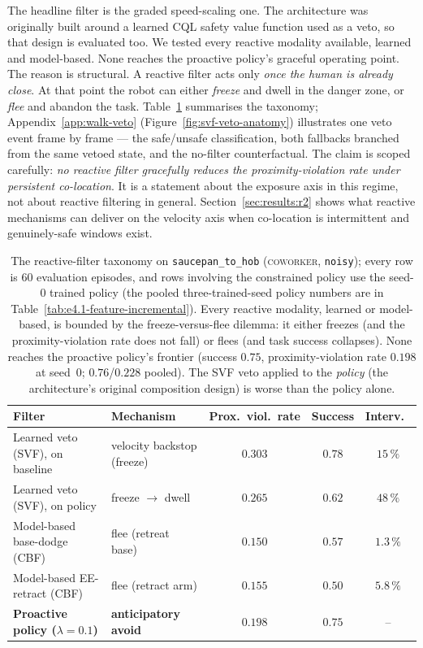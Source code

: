 \documentclass[11pt,a4paper]{report}
\newcommand{\coworker}{\textsc{coworker}}
\begin{document}
The headline filter is the graded speed-scaling one. The architecture
was originally built around a learned \textsc{CQL} safety value
function used as a veto, so that design is evaluated too. We tested
every reactive modality available, learned and model-based. None
reaches the proactive policy's graceful operating point. The reason is
structural. A reactive filter acts only \emph{once the human is already
close}. At that point the robot can either \emph{freeze} and dwell in
the danger zone, or \emph{flee} and abandon the task.
Table~\ref{tab:filter-taxonomy} summarises the taxonomy;
Appendix~\ref{app:walk-veto} (Figure~\ref{fig:svf-veto-anatomy})
illustrates one veto event frame by frame — the safe/unsafe
classification, both fallbacks branched from the same vetoed state, and
the no-filter counterfactual. The claim is
scoped carefully: \emph{no reactive filter gracefully reduces the
proximity-violation rate under persistent co-location}. It is a
statement about the exposure axis in this regime, not about reactive
filtering in general.
Section~\ref{sec:results:r2} shows what reactive mechanisms can
deliver on the velocity axis when co-location is intermittent and
genuinely-safe windows exist.

\begin{table}[htbp]
\centering
\caption{The reactive-filter taxonomy on \texttt{saucepan\_to\_hob}
(\coworker{}, \texttt{noisy}); every row is 60 evaluation episodes,
and rows involving the constrained policy use the seed-0 trained
policy (the pooled three-trained-seed policy numbers are in
Table~\ref{tab:e4.1-feature-incremental}). Every reactive modality,
learned or model-based, is bounded by the freeze-versus-flee dilemma:
it either freezes (and the proximity-violation rate does not fall) or
flees (and task success collapses). None reaches the proactive policy's
frontier (success $0.75$, proximity-violation rate $0.198$ at seed~0;
$0.76$/$0.228$ pooled).
The SVF veto applied to the \emph{policy} (the architecture's
original composition design) is worse than the policy alone.}
\label{tab:filter-taxonomy}
\small
\begin{tabular}{llccc}
\toprule
Filter & Mechanism & Prox.\ viol.\ rate & Success & Interv.\ \\
\midrule
Learned veto (SVF), on baseline   & velocity backstop (freeze) & $0.303$ & $0.78$ & $15\,\%$ \\
Learned veto (SVF), on policy     & freeze $\to$ dwell         & $0.265$ & $0.62$ & $48\,\%$ \\
Model-based base-dodge (CBF)      & flee (retreat base)        & $0.150$ & $0.57$ & $1.3\,\%$ \\
Model-based EE-retract (CBF)      & flee (retract arm)         & $0.155$ & $0.50$ & $5.8\,\%$ \\
\textbf{Proactive policy ($\lambda{=}0.1$)} & \textbf{anticipatory avoid} & $\mathbf{0.198}$ & $\mathbf{0.75}$ & -- \\
\bottomrule
\end{tabular}
\end{table}
\end{document}
